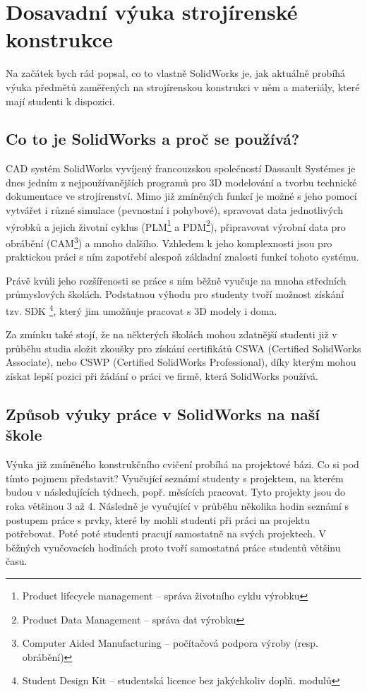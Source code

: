 \chapter{Dosavadní výuka strojírenské konstrukce}
Na začátek bych rád popsal, co to vlastně SolidWorks je, jak aktuálně probíhá výuka předmětů zaměřených na strojírenskou konstrukci v něm a materiály, které mají studenti k dispozici.

\section{Co to je SolidWorks a proč se používá?}
    CAD systém SolidWorks vyvíjený francouzskou společností Dassault Systémes je dnes jedním z nejpoužívanějších programů pro 3D modelování a tvorbu technické dokumentace ve strojírenství.
    Mimo již zmíněných funkcí je možné s jeho pomocí vytvářet i různé simulace (pevnostní i pohybové), spravovat data jednotlivých výrobků a jejich životní cyklus (PLM\footnote{Product lifecycle management -- správa životního cyklu výrobku} a PDM\footnote{Product Data Management -- správa dat výrobku}), připravovat výrobní data pro obrábění (CAM\footnote{Computer Aided Manufacturing -- počítačová podpora výroby (resp. obrábění)}) a mnoho dalšího.
    Vzhledem k jeho komplexnosti jsou pro praktickou práci s ním zapotřebí alespoň základní znalosti funkcí tohoto systému.

    Právě kvůli jeho rozšířenosti se práce s ním běžně vyučuje na mnoha středních průmyslových školách.
    Podstatnou výhodu pro studenty tvoří možnost získání tzv. SDK \footnote{Student Design Kit -- studentská licence bez jakýchkoliv doplň. modulů}, který jim umožňuje pracovat s 3D modely i doma.

    Za zmínku také stojí, že na některých školách mohou zdatnější studenti již v průběhu studia složit zkoušky pro získání certifikátů CSWA (Certified SolidWorks Associate), nebo CSWP (Certified SolidWorks Professional), díky kterým mohou získat lepší pozici při žádání o práci ve firmě, která SolidWorks používá.

\section{Způsob výuky práce v SolidWorks na naší škole}
    Výuka již zmíněného konstrukčního cvičení probíhá na projektové bázi.
    Co si pod tímto pojmem představit?
    Vyučující seznámí studenty s projektem, na kterém budou v následujících týdnech, popř. měsících pracovat. 
    Tyto projekty jsou do roka většinou 3 až 4.
    Následně je vyučující v průběhu několika hodin seznámí s postupem práce s prvky, které by mohli studenti při práci na projektu potřebovat.
    Poté poté studenti pracují samostatně na svých projektech.
    V běžných vyučovacích hodinách proto tvoří samostatná práce studentů většinu času.

